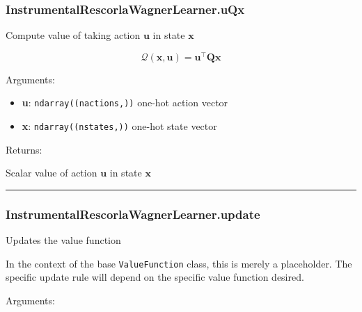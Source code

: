 \subsubsection{InstrumentalRescorlaWagnerLearner.uQx}\label{instrumentalrescorlawagnerlearner.uqx}

\begin{Shaded}
\begin{Highlighting}[]
\end{Highlighting}
\end{Shaded}

Compute value of taking action \(\mathbf u\) in state \(\mathbf x\)

\[
\mathcal Q(\mathbf x, \mathbf u) = \mathbf u^\top \mathbf Q \mathbf x
\]

Arguments:

\begin{itemize}
\tightlist
\item
  \textbf{u}: \texttt{ndarray((nactions,))} one-hot action vector
\item
  \textbf{x}: \texttt{ndarray((nstates,))} one-hot state vector
\end{itemize}

Returns:

Scalar value of action \(\mathbf u\) in state \(\mathbf x\)

\begin{center}\rule{0.5\linewidth}{\linethickness}\end{center}

\subsubsection{InstrumentalRescorlaWagnerLearner.update}\label{instrumentalrescorlawagnerlearner.update}

\begin{Shaded}
\begin{Highlighting}[]
\end{Highlighting}
\end{Shaded}

Updates the value function

In the context of the base \texttt{ValueFunction} class, this is merely
a placeholder. The specific update rule will depend on the specific
value function desired.

Arguments:

